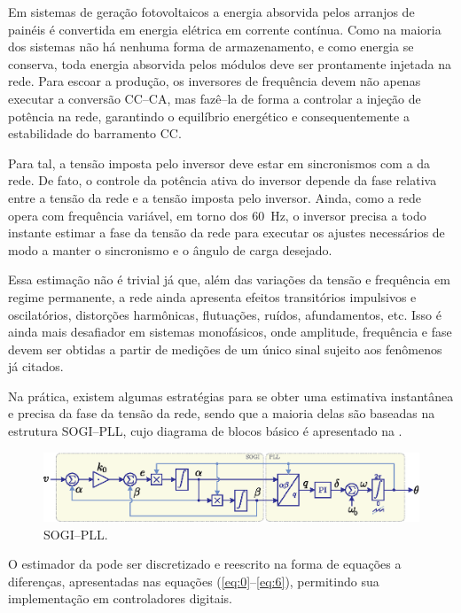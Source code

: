 \newcommand{\0}{_{_{\! n\!}}}
\newcommand{\1}{_{_{\! n\text{-}\!\>\!1\!}}}
\newcommand{\2}{_{_{\! n-\!2\!}}}
Em sistemas de geração fotovoltaicos a energia absorvida pelos arranjos de painéis é convertida em energia elétrica em
corrente contínua.
Como na maioria dos sistemas não há nenhuma forma de armazenamento, e como energia se conserva, toda energia absorvida
pelos módulos deve ser prontamente injetada na rede.
Para escoar a produção, os inversores de frequência devem não apenas executar a conversão CC--CA, mas fazê--la de forma
a controlar a injeção de potência na rede, garantindo o equilíbrio energético e consequentemente a estabilidade do
barramento CC.

Para tal, a tensão imposta pelo inversor deve estar em sincronismos com a da rede.
De fato, o controle da potência ativa do inversor depende da fase relativa entre a tensão da rede e a tensão imposta
pelo inversor.
Ainda, como a rede opera com frequência variável, em torno dos 60~Hz, o inversor precisa a todo instante estimar a fase
da tensão da rede para executar os ajustes necessários de modo a manter o sincronismo e o ângulo de carga desejado.

Essa estimação não é trivial já que, além das variações da tensão e frequência em regime permanente, a rede ainda
apresenta efeitos transitórios impulsivos e oscilatórios, distorções harmônicas, flutuações, ruídos, afundamentos, etc.
Isso é ainda mais desafiador em sistemas monofásicos, onde amplitude, frequência e fase devem ser obtidas a partir de
medições de um único sinal sujeito aos fenômenos já citados.

Na prática, existem algumas estratégias para se obter uma estimativa instantânea e precisa da fase da tensão da rede,
sendo que a maioria delas são baseadas na estrutura SOGI--PLL, cujo diagrama de blocos básico é apresentado na .
\begin{figure}[htbp]
    \centering
    \includegraphics{figs/pll.eps}
    \caption{SOGI--PLL.}
    \label{fig:ex01}
\end{figure}



O estimador da  pode ser discretizado e reescrito na forma de equações a diferenças, apresentadas nas equações
(\ref{eq:0}--\ref{eq:6}), permitindo sua implementação em controladores digitais.

